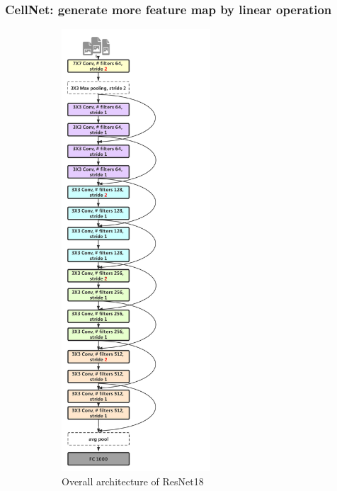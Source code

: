 \subsubsection{CellNet: generate more feature map by linear operation}

\begin{figure}[h]
	\begin{center}
		\begin{subfigure}[t]{0.49\textwidth}
		    \centering
			\includegraphics[height=6.5in]{thesis-template-master/images/res18.pdf}
			\caption{Overall architecture of ResNet18}
			\label{fig:res18}
		\end{subfigure}
		\begin{subfigure}[t]{0.49\textwidth}
		    \centering

\end{subfigure}
\end{center}
\end{figure}
